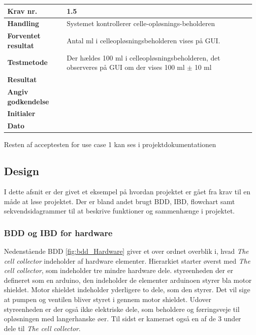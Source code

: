 	\begin{center}
		\begin{longtable}{ | m{4cm}| m{8.5cm}|} 
			\hline
			\textbf{Krav nr.} & 1.5    \\ 
			\hline
			\textbf{Handling} &  Systemet kontrollerer celle-opløsnings-beholderen  \\
			\hline
			\textbf{Forventet resultat} &  Antal ml i celleopløsningsbeholderen vises på GUI.  \\
			\hline
			\textbf{Testmetode}  & Der hældes 100 ml i celleopløsningsbeholderen, det observeres på GUI om der vises 100 ml $\pm$ 10 ml   \\
			\hline			
			\textbf{Resultat}  &    \\
			\hline
			\textbf{Angiv godkendelse} &     \\
			\hline
			\textbf{Initialer} &     \\
			\hline
			\textbf{Dato} &    \\
			\hline
		\end{longtable}
	\end{center}	
	
Resten af acceptesten for use case 1 kan ses i projektdokumentationen  

\subsection{Design}
I dette afsnit er der givet et eksempel på hvordan projektet er gået fra krav til en måde at løse projektet. Der er bland andet brugt BDD, IBD, flowchart samt sekvendsidagrammer til at beskrive funktioner og sammenhænge i projektet. 

\subsubsection{BDD og IBD for hardware}
Nedenstående BDD \ref{fig:bdd_Hardware} giver et over ordnet overblik i, hvad \textit{The cell collector} indeholder af hardware elementer. Hierarkiet starter øverst med \textit{The cell collector}, som indeholder tre mindre hardware dele. styreenheden der er defineret som en arduino, den indeholder de elementer arduinoen styrer bla motor shieldet. Motor shieldet indeholder yderligere to dele, som den styrer. Det vil sige at pumpen og ventilen bliver styret i gennem motor shieldet. Udover styreenheden er der også ikke elektriske dele, som beholdere og førringsveje til opløsningen med langerhanske øer. Til sidst er kameraet også en af de 3 under dele til \textit{The cell collector}.

